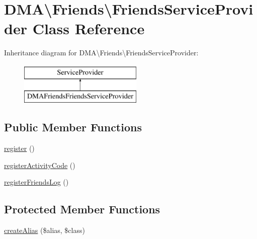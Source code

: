 \hypertarget{classDMA_1_1Friends_1_1FriendsServiceProvider}{\section{D\-M\-A\textbackslash{}Friends\textbackslash{}Friends\-Service\-Provider Class Reference}
\label{classDMA_1_1Friends_1_1FriendsServiceProvider}
}
Inheritance diagram for D\-M\-A\textbackslash{}Friends\textbackslash{}Friends\-Service\-Provider\-:\begin{figure}[H]
\begin{center}
\leavevmode
\includegraphics[height=2.000000cm]{df/d6d/classDMA_1_1Friends_1_1FriendsServiceProvider}
\end{center}
\end{figure}
\subsection*{Public Member Functions}
\begin{DoxyCompactItemize}
\item 
\hyperlink{classDMA_1_1Friends_1_1FriendsServiceProvider_a6a90d2cdc4c6b153b45764ba66e154ae}{register} ()
\item 
\hyperlink{classDMA_1_1Friends_1_1FriendsServiceProvider_aa21a040ba3b9fd8ef5cabaa63ccc10f8}{register\-Activity\-Code} ()
\item 
\hyperlink{classDMA_1_1Friends_1_1FriendsServiceProvider_a2d6ff7101ca6389c00e298f2d594a1df}{register\-Friends\-Log} ()
\end{DoxyCompactItemize}
\subsection*{Protected Member Functions}
\begin{DoxyCompactItemize}
\item 
\hyperlink{classDMA_1_1Friends_1_1FriendsServiceProvider_acad52dc5020c640afed3c4fe82243051}{create\-Alias} (\$alias, \$class)
\end{DoxyCompactItemize}


